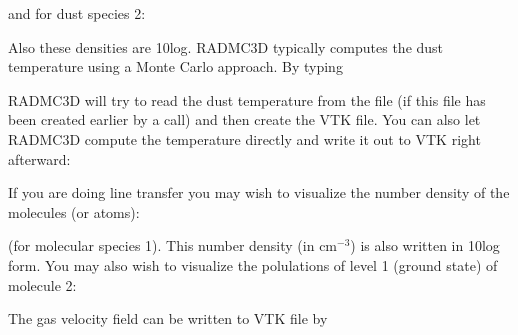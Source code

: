 \documentclass[letterpaper,10pt,english]{sphinxmanual}
\begin{document}
and for dust species 2:

\begin{sphinxVerbatim}[commandchars=\\\{\}]
  
\end{sphinxVerbatim}

Also these densities are 10\sphinxhyphen{}log. RADMC\sphinxhyphen{}3D typically computes the dust
temperature using a Monte Carlo approach. By typing

\begin{sphinxVerbatim}[commandchars=\\\{\}]
  
\end{sphinxVerbatim}

RADMC\sphinxhyphen{}3D will try to read the dust temperature from the file
 (if this file has been created
earlier by a  call) and then create
the VTK file. You can also let RADMC\sphinxhyphen{}3D compute the temperature
directly and write it out to VTK right afterward:

\begin{sphinxVerbatim}[commandchars=\\\{\}]
   
\end{sphinxVerbatim}

If you are doing line transfer you may wish to visualize the number density
of the molecules (or atoms):

\begin{sphinxVerbatim}[commandchars=\\\{\}]
  
\end{sphinxVerbatim}

(for molecular species 1). This number density (in cm\(^{-3}\)) is also
written in 10\sphinxhyphen{}log form.  You may also wish to visualize the polulations of
level 1 (ground state) of molecule 2:

\begin{sphinxVerbatim}[commandchars=\\\{\}]
   
\end{sphinxVerbatim}

The gas velocity field can be written to VTK file by
\end{document}
